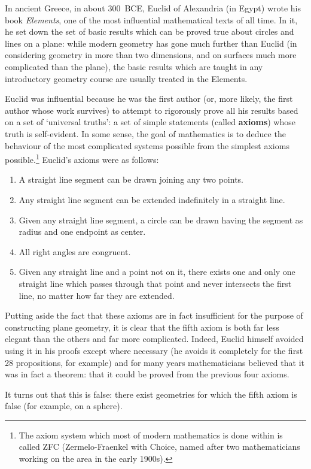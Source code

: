 \documentclass[a4paper,leqno]{article}
\numberwithin{equation}{section}
\theoremstyle{definition}
\theoremstyle{remark}
\newcommand{\df}[1]{\textbf{#1}}
\begin{document}
In ancient Greece, in about 300~BCE, Euclid of Alexandria (in Egypt) wrote his book \emph{Elements}, one of the most
influential mathematical texts of all time. In it, he set down the set of basic results which can be proved true
about circles and lines on a plane: while modern geometry has gone much further than Euclid (in considering geometry in more than
two dimensions, and on surfaces much more complicated than the plane), the basic results which are taught in any
introductory geometry course are usually treated in the Elements.

Euclid was influential because he was the first author (or, more likely, the first author whose work survives) to
attempt to rigorously prove all his results based on a set of `universal truths': a set of simple statements (called
\df{axioms}) whose truth is self-evident. In some sense, the goal of mathematics is to deduce the behaviour of the
most complicated systems possible from the simplest axioms possible.\footnote{The axiom system which most of modern
mathematics is done within is called ZFC (Zermelo-Fraenkel with Choice, named after two mathematicians working on the
area in the early 1900s).} Euclid's axioms were as follows:
\begin{enumerate}
  \item A straight line segment can be drawn joining any two points.
  \item Any straight line segment can be extended indefinitely in a straight line.
  \item Given any straight line segment, a circle can be drawn having the segment as radius and one endpoint as center.
  \item All right angles are congruent.
  \item Given any straight line and a point not on it, there exists one and only one straight line which passes through
        that point and never intersects the first line, no matter how far they are extended.
\end{enumerate}
Putting aside the fact that these axioms are in fact insufficient for the purpose of constructing plane geometry, it is
clear that the fifth axiom is both far less elegant than the others and far more complicated. Indeed, Euclid himself avoided
using it in his proofs except where necessary (he avoids it completely for the first 28 propositions, for example) and for
many years mathematicians believed that it was in fact a theorem: that it could be proved from the previous four axioms.

It turns out that this is false: there exist geometries for which the fifth axiom is false (for example, on a sphere).
\end{document}
